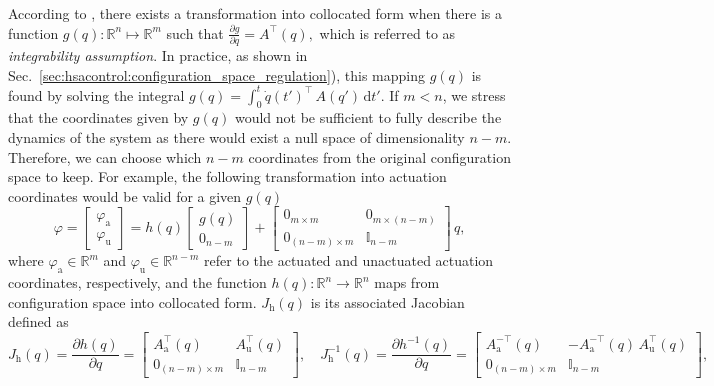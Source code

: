 According to \citet{pustina2024input}, there exists a transformation into collocated form when there is a function $g(q): \mathbb{R}^n \mapsto \mathbb{R}^m$ such that $\frac{\partial g}{\partial q} = A^\top (q),$
which is referred to as \emph{integrability assumption}. In practice, as shown in Sec.~\ref{sec:hsacontrol:configuration_space_regulation}), this mapping $g(q)$ is found by solving the integral $g(q) = \int_0^t \dot{q}(t')^\top \, A(q') \, \mathrm{d} t'$.
If $m < n$, we stress that the coordinates given by $g(q)$ would not be sufficient to fully describe the dynamics of the system as there would exist a null space of dimensionality $n - m$. Therefore, we can choose which  $n-m$ coordinates from the original configuration space to keep. For example, the following transformation into actuation coordinates would be valid for a given $g(q)$~\citep{pustina2024input}
\begin{equation}
    \varphi = \begin{bmatrix}
        \varphi_\mathrm{a}\\ \varphi_\mathrm{u}
    \end{bmatrix} = h(q) \begin{bmatrix}
        g(q)\\ 0_{n-m}
    \end{bmatrix} + \begin{bmatrix}
        0_{m \times m} & 0_{m \times (n-m)}\\
        0_{(n-m) \times m} & \mathbb{I}_{n-m}
    \end{bmatrix} \, q,
\end{equation}
where $\varphi_\mathrm{a} \in \mathbb{R}^m$ and $\varphi_\mathrm{u} \in \mathbb{R}^{n-m}$ refer to the actuated and unactuated actuation coordinates, respectively, and the function $h(q): \mathbb{R}^{n} \to \mathbb{R}^n$ maps from configuration space into collocated form. $J_\mathrm{h}(q)$ is its associated Jacobian defined as
\begin{equation}
    J_\mathrm{h}(q) = \frac{\partial h(q)}{\partial q} = \begin{bmatrix}
        A_\mathrm{a}^\top(q) & A_\mathrm{u}^\top(q)\\
        0_{(n-m) \times m} & \mathbb{I}_{n-m}
    \end{bmatrix},
    \quad
    J_\mathrm{h}^{-1}(q) = \frac{\partial h^{-1}(q)}{\partial q} = \begin{bmatrix}
        A_\mathrm{a}^{-\top}(q) & -A_\mathrm{a}^{-\top}(q) \, A_\mathrm{u}^\top(q)\\
        0_{(n-m) \times m} & \mathbb{I}_{n-m}
    \end{bmatrix},
\end{equation}

